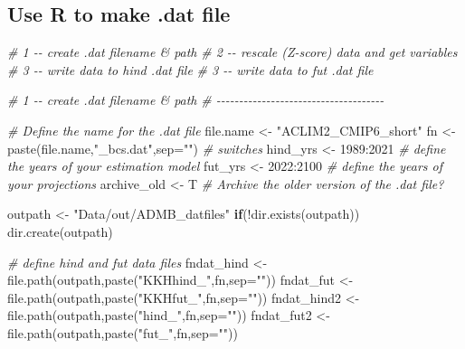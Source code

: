 \documentclass[
]{article}
\newenvironment{Shaded}{\begin{snugshade}}{\end{snugshade}}
\newcommand{\AttributeTok}[1]{\textcolor[rgb]{0.77,0.63,0.00}{#1}}
\newcommand{\CommentTok}[1]{\textcolor[rgb]{0.56,0.35,0.01}{\textit{#1}}}
\newcommand{\ControlFlowTok}[1]{\textcolor[rgb]{0.13,0.29,0.53}{\textbf{#1}}}
\newcommand{\DecValTok}[1]{\textcolor[rgb]{0.00,0.00,0.81}{#1}}
\newcommand{\FunctionTok}[1]{\textcolor[rgb]{0.00,0.00,0.00}{#1}}
\newcommand{\NormalTok}[1]{#1}
\newcommand{\OtherTok}[1]{\textcolor[rgb]{0.56,0.35,0.01}{#1}}
\newcommand{\SpecialCharTok}[1]{\textcolor[rgb]{0.00,0.00,0.00}{#1}}
\newcommand{\StringTok}[1]{\textcolor[rgb]{0.31,0.60,0.02}{#1}}
\begin{document}
\hypertarget{use-r-to-make-.dat-file}{%
\subsection{Use R to make .dat file}\label{use-r-to-make-.dat-file}}

\begin{Shaded}
\begin{Highlighting}[]
  \CommentTok{\# 1 {-}{-} create .dat filename \& path}
  \CommentTok{\# 2 {-}{-} rescale (Z{-}score) data and get variables}
  \CommentTok{\# 3 {-}{-} write data to hind .dat file}
  \CommentTok{\# 3 {-}{-} write data to fut  .dat file}
  
  \CommentTok{\# 1 {-}{-} create .dat filename \& path}
  \CommentTok{\# {-}{-}{-}{-}{-}{-}{-}{-}{-}{-}{-}{-}{-}{-}{-}{-}{-}{-}{-}{-}{-}{-}{-}{-}{-}{-}{-}{-}{-}{-}{-}{-}{-}{-}{-}{-}{-}}

  \CommentTok{\# Define the name for the .dat file}
\NormalTok{    file.name   }\OtherTok{\textless{}{-}} \StringTok{"ACLIM2\_CMIP6\_short"}
\NormalTok{    fn          }\OtherTok{\textless{}{-}} \FunctionTok{paste}\NormalTok{(file.name,}\StringTok{"\_bcs.dat"}\NormalTok{,}\AttributeTok{sep=}\StringTok{""}\NormalTok{)}
  \CommentTok{\# switches }
\NormalTok{    hind\_yrs    }\OtherTok{\textless{}{-}} \DecValTok{1989}\SpecialCharTok{:}\DecValTok{2021}   \CommentTok{\# define the years of your estimation model}
\NormalTok{    fut\_yrs     }\OtherTok{\textless{}{-}} \DecValTok{2022}\SpecialCharTok{:}\DecValTok{2100}   \CommentTok{\# define the years of your projections}
\NormalTok{    archive\_old }\OtherTok{\textless{}{-}}\NormalTok{ T           }\CommentTok{\# Archive the older version of the .dat file?}
    
    
\NormalTok{    outpath    }\OtherTok{\textless{}{-}} \StringTok{"Data/out/ADMB\_datfiles"}
    \ControlFlowTok{if}\NormalTok{(}\SpecialCharTok{!}\FunctionTok{dir.exists}\NormalTok{(outpath)) }\FunctionTok{dir.create}\NormalTok{(outpath)}
    
  \CommentTok{\# define hind and fut data files}
\NormalTok{    fndat\_hind }\OtherTok{\textless{}{-}} \FunctionTok{file.path}\NormalTok{(outpath,}\FunctionTok{paste}\NormalTok{(}\StringTok{"KKHhind\_"}\NormalTok{,fn,}\AttributeTok{sep=}\StringTok{""}\NormalTok{))}
\NormalTok{    fndat\_fut  }\OtherTok{\textless{}{-}} \FunctionTok{file.path}\NormalTok{(outpath,}\FunctionTok{paste}\NormalTok{(}\StringTok{"KKHfut\_"}\NormalTok{,fn,}\AttributeTok{sep=}\StringTok{""}\NormalTok{))}
\NormalTok{    fndat\_hind2 }\OtherTok{\textless{}{-}} \FunctionTok{file.path}\NormalTok{(outpath,}\FunctionTok{paste}\NormalTok{(}\StringTok{"hind\_"}\NormalTok{,fn,}\AttributeTok{sep=}\StringTok{""}\NormalTok{))}
\NormalTok{    fndat\_fut2  }\OtherTok{\textless{}{-}} \FunctionTok{file.path}\NormalTok{(outpath,}\FunctionTok{paste}\NormalTok{(}\StringTok{"fut\_"}\NormalTok{,fn,}\AttributeTok{sep=}\StringTok{""}\NormalTok{))}
    

\end{Highlighting}
\end{Shaded}
\end{document}
